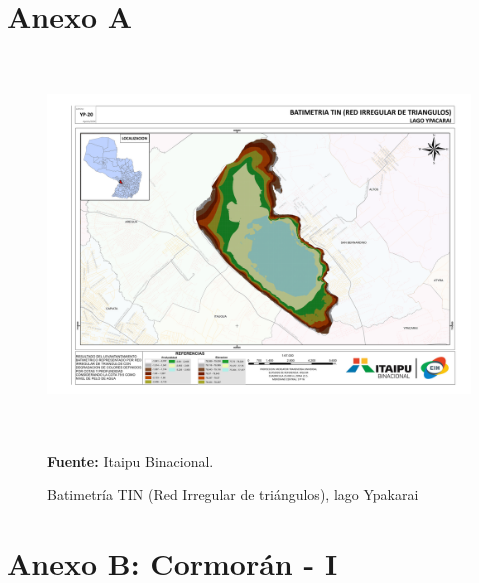 \appendixpageoff
\begin{appendices}




\chapter*{Anexo A}
\label{appendix: mapas}

\begin{figure}[ht]
    \centering
    \includegraphics[width=150mm, height=100mm]{Imagenes/cap3/Batimetria_lago_Ypacarai_TIN_A3.pdf}
    \caption[Batimetr\'ia lago Ypakarai]{Batimetr\'ia TIN (Red Irregular de triángulos), lago Ypakarai} \textbf{Fuente:}  Itaipu Binacional.
    \label{fig:BatimetriaItaipu}
\end{figure}

\chapter*{Anexo B: Cormor\'an - I}
\label{appendix: cormoran}


\end{appendices}
